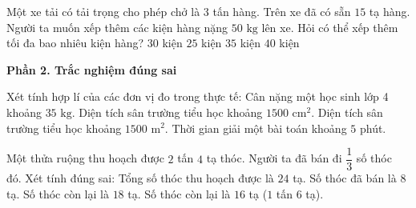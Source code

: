 \begin{ex} %
Một xe tải có tải trọng cho phép chở là $3$ tấn hàng. Trên xe đã có sẵn $15$ tạ hàng. Người ta muốn xếp thêm các kiện hàng nặng $50\text{ kg}$ lên xe. Hỏi có thể xếp thêm tối đa bao nhiêu kiện hàng?
\choice
{\True $30$ kiện}
{$25$ kiện}
{$35$ kiện}
{$40$ kiện}
\end{ex}

\textbf{Phần 2. Trắc nghiệm đúng sai}

\begin{ex} %
Xét tính hợp lí của các đơn vị đo trong thực tế:
\choiceTF
{\True Cân nặng một học sinh lớp 4 khoảng $35\text{ kg}$.}
{Diện tích sân trường tiểu học khoảng $1500\text{ cm}^2$.}
{\True Diện tích sân trường tiểu học khoảng $1500\text{ m}^2$.}
{\True Thời gian giải một bài toán khoảng $5$ phút.}
\end{ex}

\begin{ex} %
Một thửa ruộng thu hoạch được $2$ tấn $4$ tạ thóc. Người ta đã bán đi $\dfrac{1}{3}$ số thóc đó. Xét tính đúng sai:
\choiceTF
{\True Tổng số thóc thu hoạch được là $24$ tạ.}
{\True Số thóc đã bán là $8$ tạ.}
{Số thóc còn lại là $18$ tạ.}
{\True Số thóc còn lại là $16$ tạ ($1$ tấn $6$ tạ).}
\end{ex}


